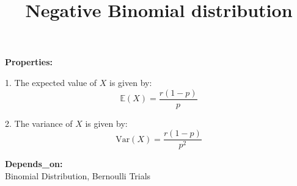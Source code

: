 \documentclass{article}
\title{Negative Binomial distribution}
\begin{document}
\maketitle

\textbf{Properties:}

1. The expected value of \( X \) is given by:
   \[
   \mathbb{E}(X) = \frac{r(1 - p)}{p}
   \]

2. The variance of \( X \) is given by:
   \[
   \text{Var}(X) = \frac{r(1 - p)}{p^2}
   \]

\textbf{Depends\_on:} \\
Binomial Distribution, Bernoulli Trials
\end{document}
